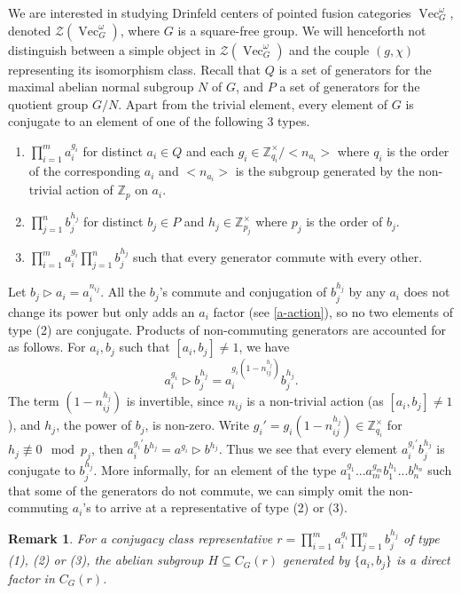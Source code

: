 \documentclass[a4paper, 10pt]{book}
\newtheorem{Rem}[theorem]{Remark}
\theoremstyle{definition}
\numberwithin{equation}{chapter}
\newcommand\hit{\triangleright}
\newcommand\Vect{\operatorname{Vec}}
\newcommand\ZZ{\mathbb Z}
\newcommand\CTR{\mathcal Z}
\begin{document}
We are interested in studying Drinfeld centers of pointed fusion categories $\Vect^\omega_G$, denoted $\CTR(\Vect^{\omega}_{G})$, where $G$ is a square-free group. We will henceforth not distinguish between a simple object in $\CTR(\Vect^{\omega}_{G})$ and the couple $(g, \chi)$ representing its isomorphism class.
Recall that $Q$ is a set of generators for the maximal abelian normal subgroup $N$ of $G$, and $P$ a set of generators for the quotient group $G/N$. Apart from the trivial element, every element of $G$ is conjugate to an element of one of the following 3 types.\begin{enumerate}
\item $\prod_{i=1}^m a_i^{g_i}$ for distinct $a_i\in Q$ and each $g_i \in \ZZ_{q_i}^\times/<n_{a_i}> $ where $q_i$ is the order of the corresponding $a_i$ and $<n_{a_i}>$ is the subgroup generated by the non-trivial action of $\ZZ_p$ on $a_i$.
\item $ \prod_{j=1}^n b_j^{h_j} $ for distinct $b_j\in P$ and $h_j \in \ZZ_{p_j}^\times$ where $p_j$ is the order of $b_j$. 
\item $ \prod_{i=1}^m a_i^{g_i} \prod_{j=1}^n b_j^{h_j} $ such that every generator commute with every other. \end{enumerate}
Let $b_j\hit a_i = a_i^{n_{ij}}$. All the $b_j$'s commute and conjugation of $b_j^{h_j}$ by any $a_i$ does not change its power but only adds an $a_i$ factor (see \ref{a-action}), so no two elements of type (2) are conjugate. Products of non-commuting generators are accounted for as follows. For $a_i, b_j$ such that $[a_i, b_j]\neq1$, we have \begin{equation}
	a_i^{g_i}\hit b_j^{h_j} = a_i^{g_i(1-n_{ij}^{h_j})}b_j^{h_j}.\label{a-action}
\end{equation} The term $(1-n_{ij}^{h_j})$ is invertible, since $n_{ij}$ is a non-trivial action (as $[a_i, b_j]\neq 1$), and $h_j$, the power of $b_j$, is non-zero. Write $g_i'= g_i(1-n_{ij}^{h_j}) \in \ZZ_{q_i}^\times$ for $h_j\not\equiv 0 \mod p_j$, then $a_i^{g_i'}b^{h_j} = a^{g_i}\hit b^{h_j}$. Thus we see that every element $a_i^{g_i'} b_j^{h_j}$ is conjugate to $b_j^{h_j}$. More informally, for an element of the type $ a_1^{g_1}...a_m^{g_m}b_1^{h_1}...b_n^{h_n} $ such that some of the generators do not commute, we can simply omit the non-commuting $a_i$'s to arrive at a representative of type (2) or (3).
\begin{Rem}\label{char}\rm For a conjugacy class representative $r= \prod_{i=1}^m a_i^{g_i} \prod_{j=1}^n b_j^{h_j}$ of type (1), (2) or (3), the abelian subgroup  $H\subseteq C_G(r)$ generated by $\{a_i, b_j\}$ is a direct factor in $C_G(r)$.
\end{Rem} 
\end{document}

